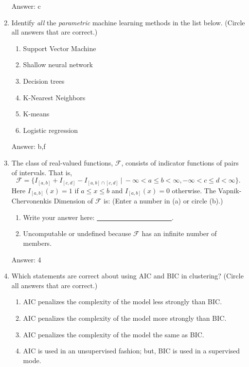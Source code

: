 \documentclass[11pt]{report}
\begin{document}
\begin{enumerate}
\begin{mdframed}
Answer: c
\end{mdframed}

\item
Identify {\em all} the {\em parametric} machine learning methods in the list below. (Circle all answers that are correct.)
\begin{enumerate}
\item
Support Vector Machine
\item
Shallow neural network
\item
Decision trees
\item
K-Nearest Neighbors
\item
K-means
\item
Logistic regression
\end{enumerate}
\begin{mdframed}
Answer: b,f
\end{mdframed}
\item
The class of real-valued functions, $\mathscr{F}$, consists of indicator functions of pairs of intervals.  That is,
$$\mathscr{F} = \{ I_{[a,b]} +I_{[c,d]} -I_{[a,b] \cap [c,d]}~ |~ -\infty < a \leq b < \infty,  -\infty < c \leq d < \infty\}.$$
Here $I_{[a,b]}(x)=1$ if $a \leq x \leq b$ and $I_{[a,b]}(x)=0$ otherwise.
The Vapnik-Chervonenkis Dimension of $\mathscr{F}$ is:  (Enter a number in (a) or circle (b).)
\begin{enumerate}
\item Write your answer here:  \underline{~~~~~~~~~~~~~~~~~~~~~~}.  
\item Uncomputable or undefined because $\mathscr{F}$ has an infinite number of members.
\end{enumerate}
\begin{mdframed}
Answer: 4
\end{mdframed}
\item
Which statements are correct about using AIC and BIC in clustering? (Circle all answers that are correct.)
\begin{enumerate}
\item AIC penalizes the complexity of the model less strongly than BIC.
\item AIC penalizes the complexity of the model more strongly than BIC.
\item AIC penalizes the complexity of the model the same as BIC.
\item AIC is used in an unsupervised fashion; but, BIC is used in a supervised mode.
\end{enumerate}

\end{enumerate}
\end{document}
